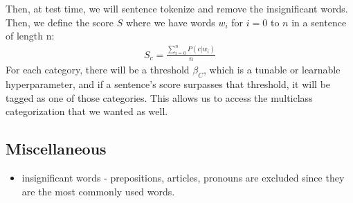 \documentclass[letterpaper]{article}
\begin{document}
Then, at test time, we will sentence tokenize and remove the insignificant words. Then, we define the score $S$ where we have words $w_i$ for $i=0$ to $n$ in a sentence of length n: \\
\begin{eqnarray*}
S_c = \frac{\sum\limits_{i=0}^n P(c | w_i)}{n}
\end{eqnarray*}
For each category, there will be a threshold $\beta_C$, which is a tunable or learnable hyperparameter, and if a sentence's score surpasses that threshold, it will be tagged as one of those categories. This allows us to access the multiclass categorization that we wanted as well.
\subsection*{Miscellaneous}
\begin{itemize}
	\item insignificant words - prepositions, articles, pronouns are excluded since they are the most commonly used words.
\end{itemize}
\end{document}

